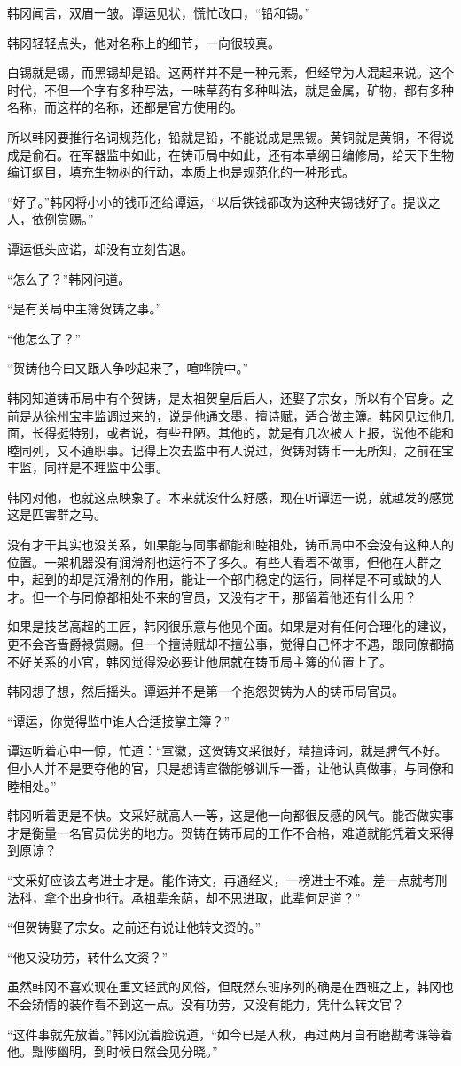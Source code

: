 韩冈闻言，双眉一皱。谭运见状，慌忙改口，“铅和锡。”

韩冈轻轻点头，他对名称上的细节，一向很较真。

白锡就是锡，而黑锡却是铅。这两样并不是一种元素，但经常为人混起来说。这个时代，不但一个字有多种写法，一味草药有多种叫法，就是金属，矿物，都有多种名称，而这样的名称，还都是官方使用的。

所以韩冈要推行名词规范化，铅就是铅，不能说成是黑锡。黄铜就是黄铜，不得说成是俞石。在军器监中如此，在铸币局中如此，还有本草纲目编修局，给天下生物编订纲目，填充生物树的行动，本质上也是规范化的一种形式。

“好了。”韩冈将小小的钱币还给谭运，“以后铁钱都改为这种夹锡钱好了。提议之人，依例赏赐。”

谭运低头应诺，却没有立刻告退。

“怎么了？”韩冈问道。

“是有关局中主簿贺铸之事。”

“他怎么了？”

“贺铸他今曰又跟人争吵起来了，喧哗院中。”

韩冈知道铸币局中有个贺铸，是太祖贺皇后后人，还娶了宗女，所以有个官身。之前是从徐州宝丰监调过来的，说是他通文墨，擅诗赋，适合做主簿。韩冈见过他几面，长得挺特别，或者说，有些丑陋。其他的，就是有几次被人上报，说他不能和睦同列，又不通职事。记得上次去监中有人说过，贺铸对铸币一无所知，之前在宝丰监，同样是不理监中公事。

韩冈对他，也就这点映象了。本来就没什么好感，现在听谭运一说，就越发的感觉这是匹害群之马。

没有才干其实也没关系，如果能与同事都能和睦相处，铸币局中不会没有这种人的位置。一架机器没有润滑剂也运行不了多久。有些人看着不做事，但他在人群之中，起到的却是润滑剂的作用，能让一个部门稳定的运行，同样是不可或缺的人才。但一个与同僚都相处不来的官员，又没有才干，那留着他还有什么用？

如果是技艺高超的工匠，韩冈很乐意与他见个面。如果是对有任何合理化的建议，更不会吝啬爵禄赏赐。但一个擅诗赋却不擅公事，觉得自己怀才不遇，跟同僚都搞不好关系的小官，韩冈觉得没必要让他屈就在铸币局主簿的位置上了。

韩冈想了想，然后摇头。谭运并不是第一个抱怨贺铸为人的铸币局官员。

“谭运，你觉得监中谁人合适接掌主簿？”

谭运听着心中一惊，忙道：“宣徽，这贺铸文采很好，精擅诗词，就是脾气不好。但小人并不是要夺他的官，只是想请宣徽能够训斥一番，让他认真做事，与同僚和睦相处。”

韩冈听着更是不快。文采好就高人一等，这是他一向都很反感的风气。能否做实事才是衡量一名官员优劣的地方。贺铸在铸币局的工作不合格，难道就能凭着文采得到原谅？

“文采好应该去考进士才是。能作诗文，再通经义，一榜进士不难。差一点就考刑法科，拿个出身也行。承祖辈余荫，却不思进取，此辈何足道？”

“但贺铸娶了宗女。之前还有说让他转文资的。”

“他又没功劳，转什么文资？”

虽然韩冈不喜欢现在重文轻武的风俗，但既然东班序列的确是在西班之上，韩冈也不会矫情的装作看不到这一点。没有功劳，又没有能力，凭什么转文官？

“这件事就先放着。”韩冈沉着脸说道，“如今已是入秋，再过两月自有磨勘考课等着他。黜陟幽明，到时候自然会见分晓。”

